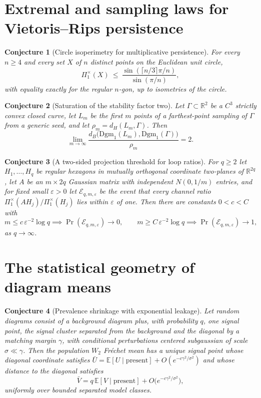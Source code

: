 \documentclass[11pt]{article}
\newtheorem{conjecture}{Conjecture}
\theoremstyle{definition}
\newcommand{\E}{\mathbb E}
\newcommand{\R}{\mathbb R}
\newcommand{\eps}{\varepsilon}
\providecommand{\R}{\mathbb R}
\providecommand{\E}{\mathbb E}
\begin{document}
\section{Extremal and sampling laws for Vietoris--Rips persistence}

\begin{conjecture}[Circle isoperimetry for multiplicative persistence]\label{ai1}
For every $n\ge4$ and every set $X$ of $n$ distinct points on the Euclidean unit circle,
\[
\Pi_1^\times(X)\ \le\ \frac{\sin(\lceil n/3\rceil\pi/n)}{\sin(\pi/n)},
\]
with equality exactly for the regular $n$-gon, up to isometries of the circle.
\end{conjecture}

\begin{conjecture}[Saturation of the stability factor two]\label{ai2}
Let $\Gamma\subset\R^2$ be a $C^3$ strictly convex closed curve, let $L_m$ be the first $m$ points of a farthest-point sampling of $\Gamma$ from a generic seed, and let $\rho_m=d_H(L_m,\Gamma)$.  Then
\[
\lim_{m\to\infty}\frac{d_B\bigl(\mathrm{Dgm}_1(L_m),\mathrm{Dgm}_1(\Gamma)\bigr)}{\rho_m}=2.
\]
\end{conjecture}

\begin{conjecture}[A two-sided projection threshold for loop ratios]\label{ai3}
For $q\ge2$ let $H_1,\ldots,H_q$ be regular hexagons in mutually orthogonal coordinate two-planes of $\R^{2q}$, let $A$ be an $m\times2q$ Gaussian matrix with independent $N(0,1/m)$ entries, and for fixed small $\eps>0$ let $\mathcal E_{q,m,\eps}$ be the event that every channel ratio $\Pi_1^\times(AH_j)/\Pi_1^\times(H_j)$ lies within $\eps$ of one.  Then there are constants $0<c<C$ with
\[
m\le c\,\eps^{-2}\log q\implies\Pr(\mathcal E_{q,m,\eps})\to0,
\qquad
m\ge C\,\eps^{-2}\log q\implies\Pr(\mathcal E_{q,m,\eps})\to1,
\]
as $q\to\infty$.
\end{conjecture}

\section{The statistical geometry of diagram means}

\begin{conjecture}[Prevalence shrinkage with exponential leakage]\label{ai4}
Let random diagrams consist of a background diagram plus, with probability $q$, one signal point, the signal cluster separated from the background and the diagonal by a matching margin $\gamma$, with conditional perturbations centered subgaussian of scale $\sigma\ll\gamma$.  Then the population $W_2$ Fr\'echet mean has a unique signal point whose diagonal coordinate satisfies $\bar U=\E[U\mid\text{present}]+O(e^{-c\gamma^2/\sigma^2})$ and whose distance to the diagonal satisfies
\[
\bar V=q\,\E[V\mid\text{present}]+O\bigl(e^{-c\gamma^2/\sigma^2}\bigr),
\]
uniformly over bounded separated model classes.
\end{conjecture}
\end{document}
